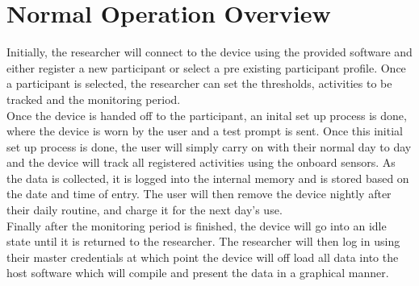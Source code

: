 \documentclass[12pt]{article}
\begin{document}
\section{Normal Operation Overview}
\label{NOO}
\setlength{\parindent}{20pt}
Initially, the researcher will connect to the device using the provided software and either register a new participant or select a pre existing participant profile. Once a participant is selected, the researcher can set the thresholds, activities to be tracked and the monitoring period. \\

Once the device is handed off to the participant, an inital set up process is done, where the device is worn by the user and a test prompt is sent. Once this initial set up process is done, the user will simply carry on with their normal day to day and the device will track all registered activities using the onboard sensors. As the data is collected, it is logged into the internal memory and is stored based on the date and time of entry. The user will then remove the device nightly after their daily routine, and charge it for the next day's use.\\

Finally after the monitoring period is finished, the device will go into an idle state until it is returned to the researcher. The researcher will then log in using their master credentials at which point the device will off load all data into the host software which will compile and present the data in a graphical manner.
\newpage
\end{document}
